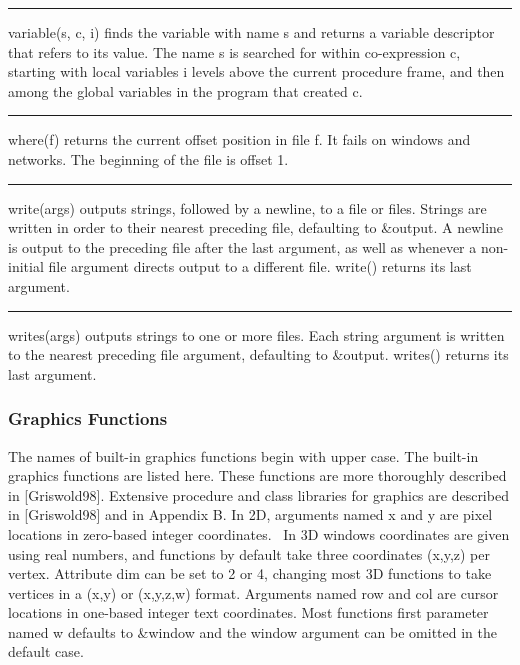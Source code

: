 \bigskip\hrule\vspace{0.1cm}

\noindent
{}\textsf{variable(s, c, i)} finds the variable
with name \textsf{s} and returns a variable descriptor that refers to
its value. The name \textsf{s} is searched for within co-expression
\textsf{c}, starting with local variables \textsf{i} levels above the
current procedure frame, and then among the global variables in the
program that created \textsf{c}.

\bigskip\hrule\vspace{0.1cm}

\noindent
{}\textsf{where(f)} returns the
current offset position in file \textsf{f}. It fails on windows and
networks. The beginning of the file is offset 1.

\bigskip\hrule\vspace{0.1cm}

\noindent
\textsf{write(args)} outputs strings, followed by a newline, to a file
or files. Strings are written in order to their nearest preceding file,
defaulting to \textsf{\&output}. A newline is output to the preceding
file after the last argument, as well as whenever a non-initial file
argument directs output to a different file.
\textsf{write()} returns its last argument.

\bigskip\hrule\vspace{0.1cm}

\noindent
\textsf{writes(args)} outputs strings to one or more files. Each string
argument is written to the nearest preceding file argument, defaulting
to \textsf{\&output}. \textsf{writes()} returns its
last argument.

\subsubsection{Graphics Functions}

The names of built-in graphics functions begin with upper case. The
built-in graphics functions are listed here. These functions are more
thoroughly described in [Griswold98]. Extensive procedure and class
libraries for graphics are described in [Griswold98] and in Appendix B.
In 2D, arguments named \textsf{x} and \textsf{y} are pixel locations in
zero-based integer coordinates. \ In 3D windows coordinates are given
using real numbers, and functions by default take three coordinates
(\textsf{x,y,z}) per vertex. Attribute \textsf{dim} can be set to 2 or
4, changing most 3D functions to take vertices in a (\textsf{x,y}) or
(\textsf{x,y,z,w}) format. Arguments named \textsf{row} and
\textsf{col} are cursor locations in one-based integer text
coordinates. Most functions{\textquotesingle} first parameter named
\textsf{w} defaults to \textsf{\&window} and the window argument can be
omitted in the default case.

